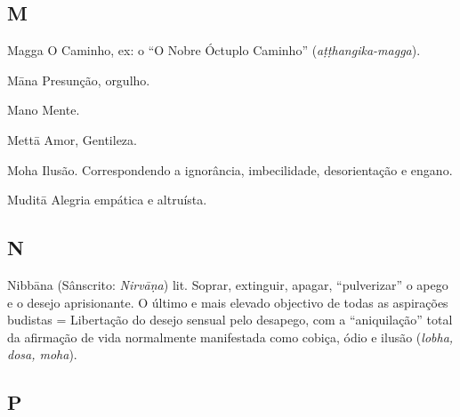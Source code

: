 \subsection{M}

\begin{glossarydescription}

\item[Magga] O Caminho, ex: o ``O Nobre Óctuplo Caminho''
(\emph{aṭṭhangika-magga}).

\item[Māna] Presunção, orgulho.

\item[Mano] Mente.

\item[Mettā] Amor, Gentileza.

\item[Moha] Ilusão. Correspondendo a ignorância, imbecilidade, desorientação e
engano.

\item[Muditā] Alegria empática e altruísta.

\end{glossarydescription}

\subsection{N}

\begin{glossarydescription}

\item[Nibbāna] (Sânscrito: \emph{Nirvāṇa}) lit. Soprar, extinguir, apagar,
``pulverizar'' o apego e o desejo aprisionante. O último e mais elevado
objectivo de todas as aspirações budistas = Libertação do desejo sensual pelo
desapego, com a ``aniquilação'' total da afirmação de vida normalmente
manifestada como cobiça, ódio e ilusão (\emph{lobha, dosa, moha}).

\end{glossarydescription}

\subsection{P}

